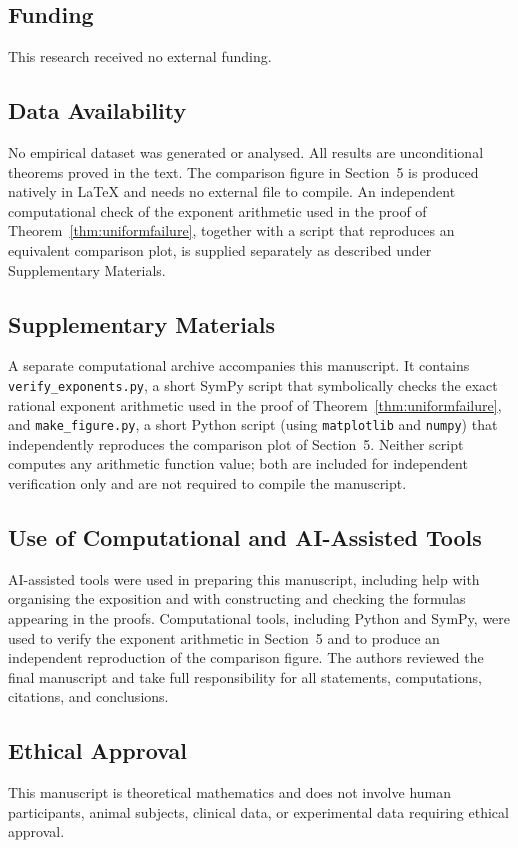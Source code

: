 \documentclass[11pt]{article}
\begin{document}
\subsection*{Funding}
This research received no external funding.

\subsection*{Data Availability}
No empirical dataset was generated or analysed. All results are unconditional theorems proved in the
text. The comparison figure in Section~5 is produced natively in \LaTeX{} and needs no external file to
compile. An independent computational check of the exponent arithmetic used in the proof of
Theorem~\ref{thm:uniformfailure}, together with a script that reproduces an equivalent comparison plot, is
supplied separately as described under Supplementary Materials.

\subsection*{Supplementary Materials}
A separate computational archive accompanies this manuscript. It contains \texttt{verify\_exponents.py},
a short SymPy script that symbolically checks the exact rational exponent arithmetic used in the proof of
Theorem~\ref{thm:uniformfailure}, and \texttt{make\_figure.py}, a short Python script (using
\texttt{matplotlib} and \texttt{numpy}) that independently reproduces the comparison plot of Section~5.
Neither script computes any arithmetic function value; both are included for independent verification
only and are not required to compile the manuscript.

\subsection*{Use of Computational and AI-Assisted Tools}
AI-assisted tools were used in preparing this manuscript, including help with organising the exposition
and with constructing and checking the formulas appearing in the proofs. Computational tools, including
Python and SymPy, were used to verify the exponent arithmetic in Section~5 and to produce an independent
reproduction of the comparison figure. The authors reviewed the final manuscript and take full
responsibility for all statements, computations, citations, and conclusions.

\subsection*{Ethical Approval}
This manuscript is theoretical mathematics and does not involve human participants, animal subjects,
clinical data, or experimental data requiring ethical approval.
\end{document}
